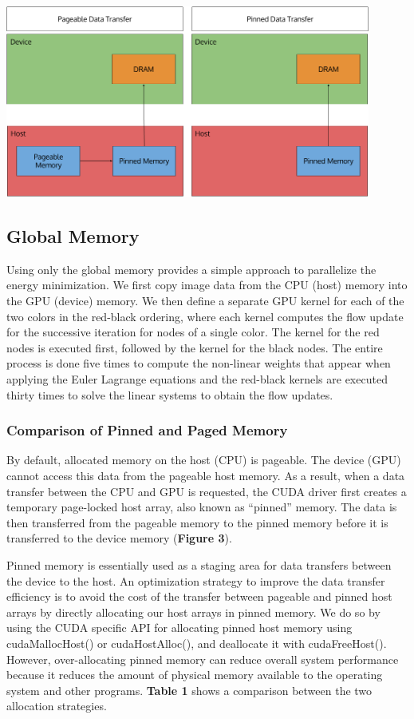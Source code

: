 \documentclass[english]{article}
\begin{document}
	\begin{center}
	\includegraphics[width=120mm]{results/images/2_pinned_paged.png}
	\end{center}		

	\subsection{Global Memory}
	Using only the global memory provides a simple approach to parallelize the energy minimization. We first copy image data from the CPU (host) memory into the GPU (device) memory. We then define a separate GPU kernel for each of the two colors in the red-black ordering, where each kernel computes the flow update for the successive iteration for nodes of a single color. The kernel for the red nodes is executed first, followed by the kernel for the black nodes. The entire process is done five times to compute the non-linear weights that appear when applying the Euler Lagrange equations and the red-black kernels are executed thirty times to solve the linear systems to obtain the flow updates. 

	\subsubsection{Comparison of Pinned and Paged Memory}
	By default, allocated memory on the host (CPU) is pageable. The device (GPU) cannot access this data from the pageable host memory. As a result, when a data transfer between the CPU and GPU is requested, the CUDA driver first creates a temporary page-locked host array, also known as “pinned” memory. The data is then transferred from the pageable memory to the pinned memory before it is transferred to the device memory (\textbf{Figure 3}).\newline

	Pinned memory is essentially used as a staging area for data transfers between the device to the host. An optimization strategy to improve the data transfer efficiency is to avoid the cost of the transfer between pageable and pinned host arrays by directly allocating our host arrays in pinned memory. We do so by using the CUDA specific API for allocating pinned host memory using cudaMallocHost() or cudaHostAlloc(), and deallocate it with cudaFreeHost(). However, over-allocating pinned memory can reduce overall system performance because it reduces the amount of physical memory available to the operating system and other programs. \textbf{Table 1} shows a comparison between the two allocation strategies.\newline
\end{document}
